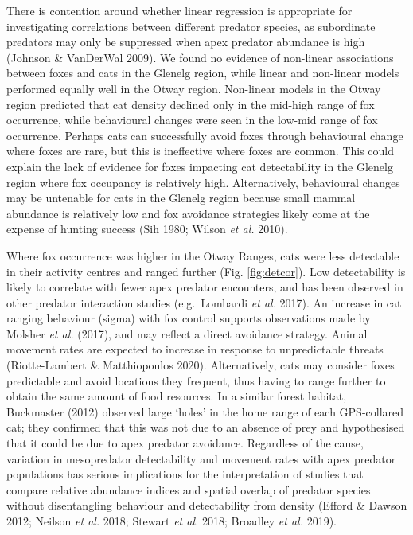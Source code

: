 \documentclass[]{elsarticle} %
\begin{document}
There is contention around whether linear regression is appropriate for investigating correlations between different predator species, as subordinate predators may only be suppressed when apex predator abundance is high (Johnson \& VanDerWal 2009). We found no evidence of non-linear associations between foxes and cats in the Glenelg region, while linear and non-linear models performed equally well in the Otway region. Non-linear models in the Otway region predicted that cat density declined only in the mid-high range of fox occurrence, while behavioural changes were seen in the low-mid range of fox occurrence. Perhaps cats can successfully avoid foxes through behavioural change where foxes are rare, but this is ineffective where foxes are common. This could explain the lack of evidence for foxes impacting cat detectability in the Glenelg region where fox occupancy is relatively high. Alternatively, behavioural changes may be untenable for cats in the Glenelg region because small mammal abundance is relatively low and fox avoidance strategies likely come at the expense of hunting success (Sih 1980; Wilson \emph{et al.} 2010).

Where fox occurrence was higher in the Otway Ranges, cats were less detectable in their activity centres and ranged further (Fig. \ref{fig:detcor}). Low detectability is likely to correlate with fewer apex predator encounters, and has been observed in other predator interaction studies (e.g.~Lombardi \emph{et al.} 2017). An increase in cat ranging behaviour (sigma) with fox control supports observations made by Molsher \emph{et al.} (2017), and may reflect a direct avoidance strategy. Animal movement rates are expected to increase in response to unpredictable threats (Riotte-Lambert \& Matthiopoulos 2020). Alternatively, cats may consider foxes predictable and avoid locations they frequent, thus having to range further to obtain the same amount of food resources. In a similar forest habitat, Buckmaster (2012) observed large `holes' in the home range of each GPS-collared cat; they confirmed that this was not due to an absence of prey and hypothesised that it could be due to apex predator avoidance. Regardless of the cause, variation in mesopredator detectability and movement rates with apex predator populations has serious implications for the interpretation of studies that compare relative abundance indices and spatial overlap of predator species without disentangling behaviour and detectability from density (Efford \& Dawson 2012; Neilson \emph{et al.} 2018; Stewart \emph{et al.} 2018; Broadley \emph{et al.} 2019).
\end{document}
